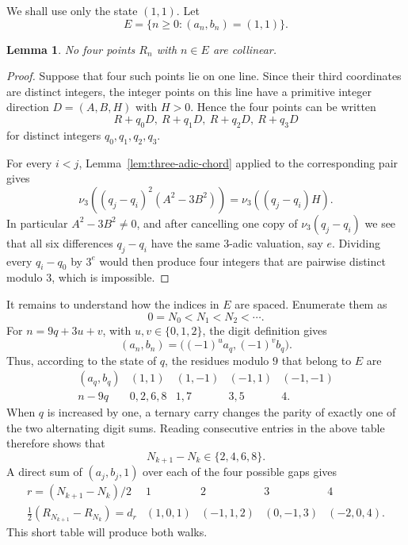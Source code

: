 \documentclass[11pt]{article}
\newtheorem*{lemma}{Lemma}
\begin{document}
We shall use only the state $(1,1)$.  Let
\[
 E=\{n\ge0:(a_n,b_n)=(1,1)\}.
\]

\begin{lemma}\label{lem:no-four-selected}
No four points $R_n$ with $n\in E$ are collinear.
\end{lemma}

\begin{proof}
Suppose that four such points lie on one line.  Since their third coordinates
are distinct integers, the integer points on this line have a primitive
integer direction $D=(A,B,H)$ with $H>0$.  Hence the four points can be
written
\[
 R+q_0D,\ R+q_1D,\ R+q_2D,\ R+q_3D
\]
for distinct integers $q_0,q_1,q_2,q_3$.

For every $i<j$, Lemma~\ref{lem:three-adic-chord} applied to the
corresponding pair gives
\[
 \nu_3\!\left((q_j-q_i)^2(A^2-3B^2)\right)
   =\nu_3\!\left((q_j-q_i)H\right).
\]
In particular $A^2-3B^2\ne0$, and after cancelling one copy of
$\nu_3(q_j-q_i)$ we see that all six differences $q_j-q_i$ have the same
$3$-adic valuation, say $e$.  Dividing every $q_i-q_0$ by $3^e$ would then
produce four integers that are pairwise distinct modulo $3$, which is
impossible.
\end{proof}

It remains to understand how the indices in $E$ are spaced.  Enumerate them
as
\[
 0=N_0<N_1<N_2<\cdots.
\]
For $n=9q+3u+v$, with $u,v\in\{0,1,2\}$, the digit definition gives
\begin{equation}\label{eq:mod-nine-state}
 (a_n,b_n)=\bigl((-1)^u a_q,(-1)^v b_q\bigr).
\end{equation}
Thus, according to the state of $q$, the residues modulo $9$ that belong to
$E$ are
\[
\begin{array}{c|cccc}
(a_q,b_q)&(1,1)&(1,-1)&(-1,1)&(-1,-1)\\ \hline
n-9q&0,2,6,8&1,7&3,5&4.
\end{array}
\]
When $q$ is increased by one, a ternary carry changes the parity of exactly
one of the two alternating digit sums.  Reading consecutive entries in the
above table therefore shows that
\[
 N_{k+1}-N_k\in\{2,4,6,8\}.
\]
A direct sum of $(a_j,b_j,1)$ over each of the four possible gaps gives
\begin{equation}\label{eq:return-displacements}
\begin{array}{c|cccc}
r=(N_{k+1}-N_k)/2&1&2&3&4\\ \hline
\frac12(R_{N_{k+1}}-R_{N_k})=d_r
 &(1,0,1)&(-1,1,2)&(0,-1,3)&(-2,0,4).
\end{array}
\end{equation}
This short table will produce both walks.
\end{document}

